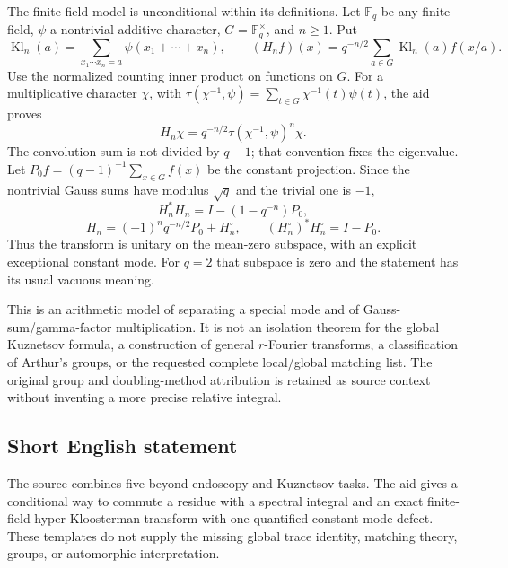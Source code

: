 \documentclass[11pt]{article}
\newcommand{\F}{\mathbb{F}}
\begin{document}
The finite-field model is unconditional within its definitions. Let $\F_q$ be any finite field, $\psi$ a nontrivial additive character, $G=\F_q^\times$, and $n\geq1$. Put
\[
\operatorname{Kl}_n(a)=\sum_{x_1\cdots x_n=a}\psi(x_1+\cdots+x_n),\qquad
(H_nf)(x)=q^{-n/2}\sum_{a\in G}\operatorname{Kl}_n(a)f(x/a).
\]
Use the normalized counting inner product on functions on $G$. For a multiplicative character $\chi$, with $\tau(\chi^{-1},\psi)=\sum_{t\in G}\chi^{-1}(t)\psi(t)$, the aid proves
\[
H_n\chi=q^{-n/2}\tau(\chi^{-1},\psi)^n\chi.
\]
The convolution sum is not divided by $q-1$; that convention fixes the eigenvalue. Let $P_0f=(q-1)^{-1}\sum_{x\in G}f(x)$ be the constant projection. Since the nontrivial Gauss sums have modulus $\sqrt q$ and the trivial one is $-1$,
\[
H_n^*H_n=I-(1-q^{-n})P_0,
\]
\[
H_n=(-1)^nq^{-n/2}P_0+H_n^\circ,
\qquad (H_n^\circ)^*H_n^\circ=I-P_0.
\]
Thus the transform is unitary on the mean-zero subspace, with an explicit exceptional constant mode. For $q=2$ that subspace is zero and the statement has its usual vacuous meaning.

This is an arithmetic model of separating a special mode and of Gauss-sum/gamma-factor multiplication. It is not an isolation theorem for the global Kuznetsov formula, a construction of general $r$-Fourier transforms, a classification of Arthur's groups, or the requested complete local/global matching list. The original group and doubling-method attribution is retained as source context without inventing a more precise relative integral.
\subsection{Short English statement}
The source combines five beyond-endoscopy and Kuznetsov tasks. The aid gives a conditional way to commute a residue with a spectral integral and an exact finite-field hyper-Kloosterman transform with one quantified constant-mode defect. These templates do not supply the missing global trace identity, matching theory, groups, or automorphic interpretation.
\end{document}

